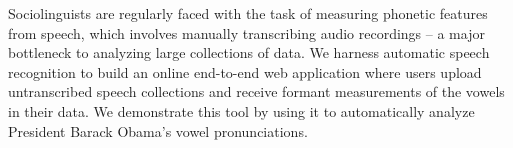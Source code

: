 Sociolinguists are regularly faced with the task of measuring phonetic features from speech, which involves manually transcribing  audio recordings -- a major bottleneck to analyzing large collections of data.  We harness automatic speech recognition to build an online end-to-end web application where users upload untranscribed speech collections and receive formant measurements of the vowels in their data. We demonstrate this tool by using it to automatically analyze President Barack Obama's vowel pronunciations.
